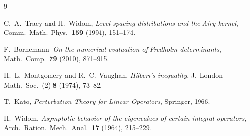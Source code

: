 \documentclass[12pt,a4paper]{amsart}
\theoremstyle{definition}
\begin{document}
\begin{thebibliography}{9}

C.~A.~Tracy and H.~Widom,
\textit{Level-spacing distributions and the Airy kernel},
Comm.\ Math.\ Phys.\ \textbf{159} (1994), 151--174.

F.~Bornemann,
\textit{On the numerical evaluation of Fredholm determinants},
Math.\ Comp.\ \textbf{79} (2010), 871--915.

H.~L.~Montgomery and R.~C.~Vaughan,
\textit{Hilbert's inequality},
J.\ London Math.\ Soc.\ (2) \textbf{8} (1974), 73--82.

T.~Kato,
\textit{Perturbation Theory for Linear Operators},
Springer, 1966.

H.~Widom,
\textit{Asymptotic behavior of the eigenvalues of certain integral operators},
Arch.\ Ration.\ Mech.\ Anal.\ \textbf{17} (1964), 215--229.

\end{thebibliography}
\end{document}
